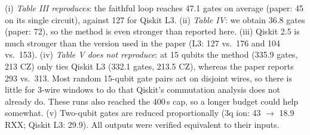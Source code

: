 (i) \emph{Table III reproduces}: the faithful loop reaches 47.1 gates on average (paper: 45 on its single circuit), against
127 for Qiskit L3. (ii) \emph{Table IV}: we obtain 36.8 gates (paper: 72), so the method is even stronger than reported here.
(iii) Qiskit 2.5 is much stronger than the version used in the paper (L3: 127 vs.\ 176 and 104 vs.\ 153). (iv) \emph{Table V does not
reproduce}: at 15 qubits the method (335.9 gates, 213 CZ) only ties Qiskit L3 (332.1 gates, 213.5 CZ), whereas the paper reports
293 vs.\ 313. Most random 15-qubit gate pairs act on disjoint wires, so there is little for 3-wire windows to do that Qiskit's
commutation analysis does not already do. These runs also reached the 400\,s cap, so a longer budget could help somewhat.
(v) Two-qubit gates are reduced proportionally (3q ion: 43 $\to$ 18.9 RXX; Qiskit L3: 29.9). All outputs were verified equivalent to their inputs.
